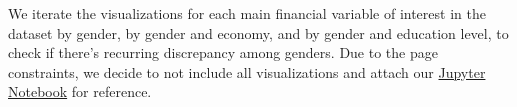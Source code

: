 \documentclass[12pt]{article}
\begin{document}
We iterate the visualizations for each main financial variable of
interest in the dataset by gender, by gender and economy, and by gender
and education level, to check if there's recurring discrepancy among
genders. Due to the page constraints, we decide to not include all
visualizations and attach our
\href{https://drive.google.com/file/d/1f9AauOn4I2Rl5io_viMw0WbEXKFiJcRA/view?usp=sharing}{Jupyter
Notebook} for reference.



\end{document}
